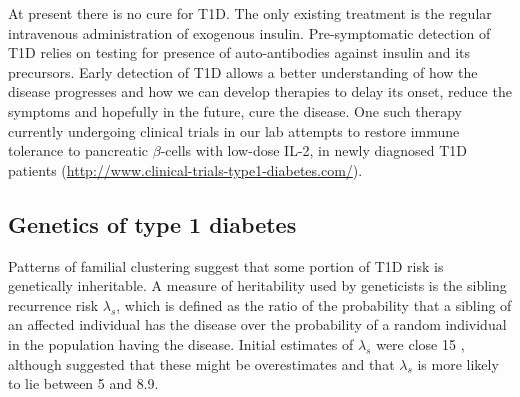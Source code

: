 At present there is no cure for \gls{T1D}.
The only existing treatment is the regular intravenous administration of exogenous insulin.  
Pre-symptomatic detection of T1D relies on testing for presence of auto-antibodies against insulin and its precursors.
Early detection of T1D allows a better understanding of how the disease progresses and how we can develop therapies to delay its onset,
reduce the symptoms and hopefully in the future, cure the disease.  
One such therapy currently undergoing clinical trials in our lab attempts to restore immune tolerance to pancreatic $\beta$-cells with low-dose \gls{IL-2},
in newly diagnosed \gls{T1D} patients (\url{http://www.clinical-trials-type1-diabetes.com/}).


\subsection{Genetics of type 1 diabetes}


Patterns of familial clustering suggest that some portion of T1D risk is genetically inheritable.
A measure of heritability used by geneticists is the sibling recurrence risk $\lambda_s$, which is defined as
the ratio of the probability that a sibling of an affected individual has the disease over the probability of a random individual in the population
having the disease.
Initial estimates of $\lambda_s$ were close 15 \citep{Risch:1987wm},
although \citet{Clayton:2009kf} suggested that these might be overestimates and that $\lambda_s$ is more likely to lie between 5 and 8.9.


